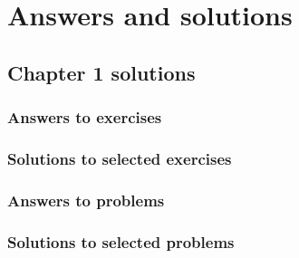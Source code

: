 
\chapter{Answers and solutions}
\label{appendix:ans_and_solutions}


\setlength\partopsep{-0.5\topsep}   %


	\section*{Chapter 1 solutions}
	\label{sec:chapter1sols}	
	{ \footnotesize 

		\subsection*{Answers to exercises}

		\subsection*{Solutions to selected exercises}
		
		\subsection*{Answers to problems}

		\subsection*{Solutions to selected problems}

	}  %


